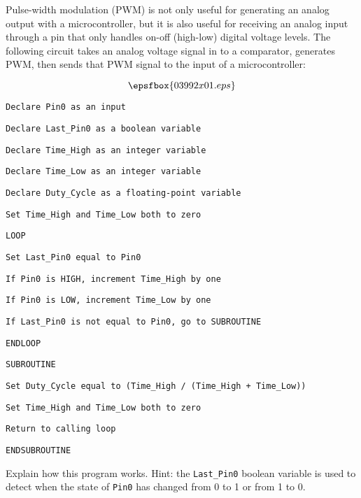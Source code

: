 

Pulse-width modulation (PWM) is not only useful for generating an analog output with a microcontroller, but it is also useful for receiving an analog input through a pin that only handles on-off (high-low) digital voltage levels.  The following circuit takes an analog voltage signal in to a comparator, generates PWM, then sends that PWM signal to the input of a microcontroller:

$$\epsfbox{03992x01.eps}$$

\noindent
{}

{\tt Declare Pin0 as an input}

{\tt Declare Last\_Pin0 as a boolean variable}

{\tt Declare Time\_High as an integer variable}

{\tt Declare Time\_Low as an integer variable}

{\tt Declare Duty\_Cycle as a floating-point variable}

{\tt Set Time\_High and Time\_Low both to zero}

{\tt LOOP}

\hskip 10pt {\tt Set Last\_Pin0 equal to Pin0}

\hskip 10pt {\tt If Pin0 is HIGH, increment Time\_High by one}

\hskip 10pt {\tt If Pin0 is LOW, increment Time\_Low by one}

\hskip 10pt {\tt If Last\_Pin0 is not equal to Pin0, go to SUBROUTINE}

{\tt ENDLOOP}

\vskip 10pt

{\tt SUBROUTINE}

\hskip 10pt {\tt Set Duty\_Cycle equal to (Time\_High / (Time\_High + Time\_Low))}

\hskip 10pt {\tt Set Time\_High and Time\_Low both to zero}

\hskip 10pt {\tt Return to calling loop}

{\tt ENDSUBROUTINE}

\vskip 10pt

Explain how this program works.  Hint: the {\tt Last\_Pin0} boolean variable is used to detect when the state of {\tt Pin0} has changed from 0 to 1 or from 1 to 0.

